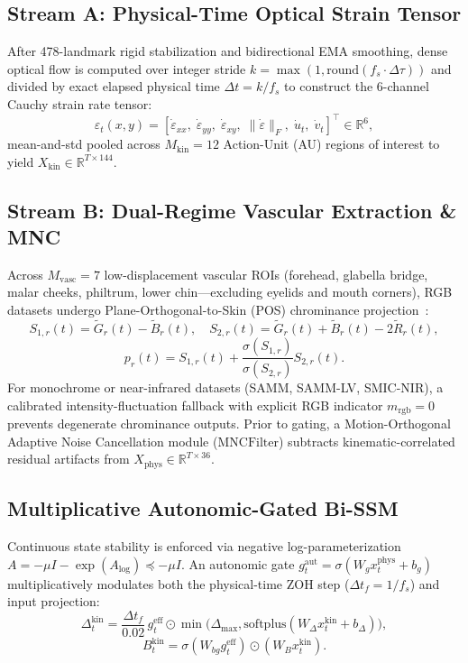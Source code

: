 \documentclass[10pt,twocolumn,letterpaper]{article}
\begin{document}
\subsection{Stream A: Physical-Time Optical Strain Tensor}
After 478-landmark rigid stabilization and bidirectional EMA smoothing, dense optical flow is computed over integer stride $k = \max(1, \mathrm{round}(f_s \cdot \Delta\tau))$ and divided by exact elapsed physical time $\Delta t = k / f_s$ to construct the 6-channel Cauchy strain rate tensor:
\begin{equation}
\varepsilon_t(x,y) = \left[ \dot{\varepsilon}_{xx}, \; \dot{\varepsilon}_{yy}, \; \dot{\varepsilon}_{xy}, \; \|\dot{\varepsilon}\|_F, \; \dot{u}_t, \; \dot{v}_t \right]^\top \in \mathbb{R}^6,
\end{equation}
mean-and-std pooled across $M_{\mathrm{kin}}=12$ Action-Unit (AU) regions of interest to yield $X_{\mathrm{kin}} \in \mathbb{R}^{T \times 144}$.

\subsection{Stream B: Dual-Regime Vascular Extraction \& MNC}
Across $M_{\mathrm{vasc}}=7$ low-displacement vascular ROIs (forehead, glabella bridge, malar cheeks, philtrum, lower chin—excluding eyelids and mouth corners), RGB datasets undergo Plane-Orthogonal-to-Skin (POS) chrominance projection~\cite{wang2017pos}:
\begin{equation}
S_{1,r}(t) = \tilde{G}_r(t) - \tilde{B}_r(t), \quad S_{2,r}(t) = \tilde{G}_r(t) + \tilde{B}_r(t) - 2\tilde{R}_r(t),
\end{equation}
\begin{equation}
p_r(t) = S_{1,r}(t) + \frac{\sigma(S_{1,r})}{\sigma(S_{2,r})} S_{2,r}(t).
\end{equation}
For monochrome or near-infrared datasets (SAMM, SAMM-LV, SMIC-NIR), a calibrated intensity-fluctuation fallback with explicit RGB indicator $m_{\mathrm{rgb}}=0$ prevents degenerate chrominance outputs. Prior to gating, a Motion-Orthogonal Adaptive Noise Cancellation module ($\mathrm{MNCFilter}$) subtracts kinematic-correlated residual artifacts from $X_{\mathrm{phys}} \in \mathbb{R}^{T \times 36}$.

\subsection{Multiplicative Autonomic-Gated Bi-SSM}
Continuous state stability is enforced via negative log-parameterization $A = -\mu I - \exp(A_{\log}) \preceq -\mu I$. An autonomic gate $g_t^{\mathrm{aut}} = \sigma(W_g x_t^{\mathrm{phys}} + b_g)$ multiplicatively modulates both the physical-time ZOH step ($\Delta t_f = 1/f_s$) and input projection:
\begin{equation}
\Delta_t^{\mathrm{kin}} = \frac{\Delta t_f}{0.02}\, g_t^{\mathrm{eff}} \odot \min\big(\Delta_{\max}, \mathrm{softplus}(W_\Delta x_t^{\mathrm{kin}} + b_\Delta)\big),
\end{equation}
\begin{equation}
B_t^{\mathrm{kin}} = \sigma(W_{bg} g_t^{\mathrm{eff}}) \odot (W_B x_t^{\mathrm{kin}}).
\end{equation}
\end{document}

